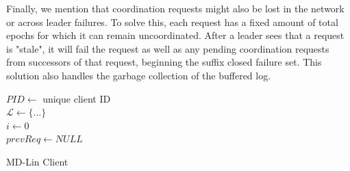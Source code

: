Finally, we mention that coordination requests might also be lost in the network or across leader failures. To solve this, each request has a fixed amount of total epochs for which it can remain uncoordinated. After a leader sees that a request is "stale", it will fail the request as well as any pending coordination requests from successors of that request, beginning the suffix closed failure set. This solution also handles the garbage collection of the buffered log.

\begin{algorithm}
    \State $PID \gets$ unique client ID\\
    \State $\mathcal{L} \gets \{...\}$ \\
    \State $i \gets 0$ \\
    \State $prevReq \gets NULL$\\

    \caption{MD-Lin Client}
    \label{clientprotocol}
\end{algorithm}
